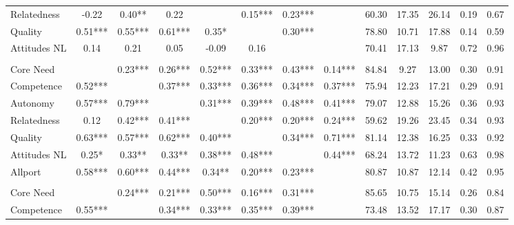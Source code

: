\begin{table}
\begin{minipage}[t][\textheight][t]{\textwidth}
{\begin{tabular}[t]{lcccccccccccc}
\hspace{1em}Relatedness & -0.22 & 0.40** & 0.22 &  & 0.15*** & 0.23*** &  & 60.30 & 17.35 & 26.14 & 0.19 & 0.67\\
\hspace{1em}Quality & 0.51*** & 0.55*** & 0.61*** & 0.35* &  & 0.30*** &  & 78.80 & 10.71 & 17.88 & 0.14 & 0.59\\
\hspace{1em}Attitudes NL & 0.14 & 0.21 & 0.05 & -0.09 & 0.16 &  &  & 70.41 & 17.13 & 9.87 & 0.72 & 0.96\\
\addlinespace[0.3em]
\multicolumn{13}{l}{\textbf{Study 3}}\\
\hspace{1em}Core Need &  & 0.23*** & 0.26*** & 0.52*** & 0.33*** & 0.43*** & 0.14*** & 84.84 & 9.27 & 13.00 & 0.30 & 0.91\\
\hspace{1em}Competence & 0.52*** &  & 0.37*** & 0.33*** & 0.36*** & 0.34*** & 0.37*** & 75.94 & 12.23 & 17.21 & 0.29 & 0.91\\
\hspace{1em}Autonomy & 0.57*** & 0.79*** &  & 0.31*** & 0.39*** & 0.48*** & 0.41*** & 79.07 & 12.88 & 15.26 & 0.36 & 0.93\\
\hspace{1em}Relatedness & 0.12 & 0.42*** & 0.41*** &  & 0.20*** & 0.20*** & 0.24*** & 59.62 & 19.26 & 23.45 & 0.34 & 0.93\\
\hspace{1em}Quality & 0.63*** & 0.57*** & 0.62*** & 0.40*** &  & 0.34*** & 0.71*** & 81.14 & 12.38 & 16.25 & 0.33 & 0.92\\
\hspace{1em}Attitudes NL & 0.25* & 0.33** & 0.33** & 0.38*** & 0.48*** &  & 0.44*** & 68.24 & 13.72 & 11.23 & 0.63 & 0.98\\
\hspace{1em}Allport & 0.58*** & 0.60*** & 0.44*** & 0.34** & 0.20*** & 0.23*** &  & 80.87 & 10.87 & 12.14 & 0.42 & 0.95\\
\addlinespace[0.3em]
\multicolumn{13}{l}{\textbf{Across Studies}}\\
\hspace{1em}Core Need &  & 0.24*** & 0.21*** & 0.50*** & 0.16*** & 0.31*** &  & 85.65 & 10.75 & 15.14 & 0.26 & 0.84\\
\hspace{1em}Competence & 0.55*** &  & 0.34*** & 0.33*** & 0.35*** & 0.39*** &  & 73.48 & 13.52 & 17.17 & 0.30 & 0.87\\

\end{tabular}}
\end{minipage}
\end{table}

